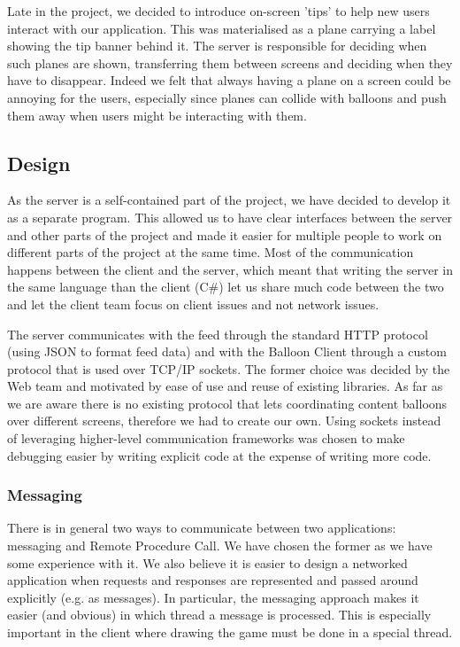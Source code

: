 Late in the project, we decided to introduce on-screen 'tips' to help new users
interact with our application. This was materialised as a plane carrying a label
showing the tip banner behind it. The server is responsible for deciding when 
such planes are shown, transferring them between screens and deciding when they
have to disappear. Indeed we felt that always having a plane on a screen could
be annoying for the users, especially since planes can collide with balloons 
and push them away when users might be interacting with them.

\clearpage{}
\subsection{Design}

As the server is a self-contained part of the project, we have decided to 
develop it as a separate program. This allowed us to have clear interfaces 
between the server and other parts of the project and made it easier for
multiple people to work on different parts of the project at the same time.
Most of the communication happens between the client and the server, which 
meant that writing the server in the same language than the client (C\#) let us 
share much code between the two and let the client team focus on client issues 
and not network issues.

The server communicates with the feed through the standard HTTP protocol 
(using JSON to format feed data) and with the Balloon Client through a custom 
protocol that is used over TCP/IP sockets. The former choice was decided by the 
Web team and motivated by ease of use and reuse of existing libraries. As far 
as we are aware there is no existing protocol that lets coordinating content
balloons over different screens, therefore we had to create our own. Using 
sockets instead of leveraging higher-level communication frameworks was chosen 
to make debugging easier by writing explicit code at the expense of writing 
more code.

\subsubsection{Messaging}

There is in general two ways to communicate between two applications: messaging 
and Remote Procedure Call. We have chosen the former as we have some experience 
with it. We also believe it is easier to design a networked application when 
requests and responses are represented and passed around explicitly (e.g. as 
messages). In particular, the messaging approach makes it easier (and obvious) 
in which thread a message is processed. This is especially important in the 
client where drawing the game must be done in a special thread.

